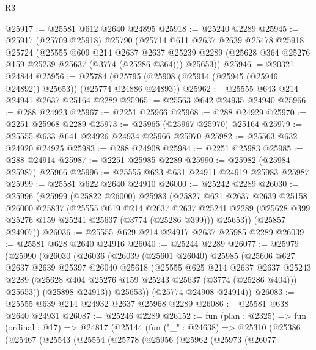 \begin{lexlean}{R3}
\begin{coremodule}
@25917 := @25581 @612 @2640 @24895
@25918 := @25240 @2289
@25945 := @25917
    (@25709 @25918)
    @25790
    (@25714
      @611
      @2637
      @2639
      @25478
      @25918
      @25724
      (@25555
        @609
        @214
        @2637
        @2637
        @25239
        @2289
        (@25628 @364 @25276 @159 @25239 @25637 (@3774 (@25286 @364)))
        @25653))
@25946 := @20321 @24844
@25956 := @25784 (@25795 (@25908 (@25914 (@25945 (@25946 @24892)) @25653)) (@25774 @24886 @24893))
@25962 := @25555 @643 @214 @24941 @2637 @25164 @2289
@25965 := @25563 @642 @24935 @24940
@25966 := @288 @24923
@25967 := @2251 @25966
@25968 := @288 @24929
@25970 := @2251 @25968 @2289
@25973 := @25965 (@25967 @25970) @25164
@25979 := @25555 @633 @641 @24926 @24934 @25966 @25970
@25982 := @25563 @632 @24920 @24925
@25983 := @288 @24908
@25984 := @2251 @25983
@25985 := @288 @24914
@25987 := @2251 @25985 @2289
@25990 := @25982 (@25984 @25987) @25966
@25996 := @25555 @623 @631 @24911 @24919 @25983 @25987
@25999 := @25581 @622 @2640 @24910
@26000 := @25242 @2289
@26030 := @25996
    (@25999
      (@25822 @26000)
      @25983
      (@25827
        @621
        @2637
        @2639
        @25158
        @26000
        @25837
        (@25555
          @619
          @214
          @2637
          @2637
          @25241
          @2289
          (@25628 @399 @25276 @159 @25241 @25637 (@3774 (@25286 @399)))
          @25653))
      (@25857 @24907))
@26036 := @25555 @629 @214 @24917 @2637 @25985 @2289
@26039 := @25581 @628 @2640 @24916
@26040 := @25244 @2289
@26077 := @25979
    (@25990
      (@26030
        (@26036
          (@26039
            (@25601 @26040)
            @25985
            (@25606
              @627
              @2637
              @2639
              @25397
              @26040
              @25618
              (@25555
                @625
                @214
                @2637
                @2637
                @25243
                @2289
                (@25628 @404 @25276 @159 @25243 @25637 (@3774 (@25286 @404)))
                @25653))
            (@25898 @24913))
          @25653))
      (@25774 @24908 @24914))
@26083 := @25555 @639 @214 @24932 @2637 @25968 @2289
@26086 := @25581 @638 @2640 @24931
@26087 := @25246 @2289
@26152 := fun (plan : @2325) =>
  fun (ordinal : @17) =>
  @24817
    (@25144
      (fun ("_" : @24638) =>
      @25310
        (@25386
          (@25467
            (@25543
              (@25554
                (@25778
                  (@25956
                    (@25962
                      (@25973
                        (@26077

\end{coremodule}
\end{lexlean}

